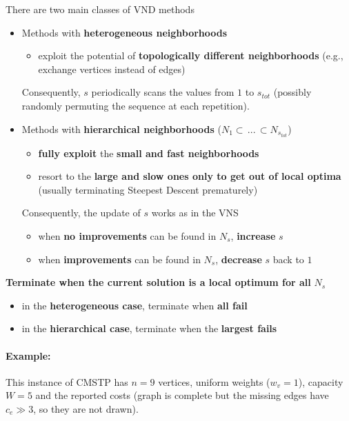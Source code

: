 There are two main classes of VND methods
\begin{itemize}
	\item Methods with \textbf{heterogeneous neighborhoods}
	\begin{itemize}
		\item exploit the potential of \textbf{topologically different neighborhoods} (e.g., exchange vertices instead of edges)
	\end{itemize}
	Consequently, $s$ periodically scans the values from $1$ to $s_{tot}$ (possibly randomly permuting the sequence at each repetition).\\
	
	\item Methods with \textbf{hierarchical neighborhoods} ($N_1 \subset \, ... \, \subset N_{s_{tot}}$)
	\begin{itemize}
		\item \textbf{fully exploit} the \textbf{small and fast neighborhoods}
		\item resort to the \textbf{large and slow ones only to get out of local optima} (usually terminating Steepest Descent prematurely)
	\end{itemize}
	Consequently, the update of $s$ works as in the VNS
	\begin{itemize}
		\item when \textbf{no improvements} can be found in $N_s$, \textbf{increase} $s$
		\item when \textbf{improvements} can be found in $N_s$, \textbf{decrease} $s$ back to $1$
	\end{itemize}
\end{itemize}

\textbf{Terminate when the current solution is a local optimum for all} $N_s$
\begin{itemize}
	\item in the \textbf{heterogeneous case}, terminate when \textbf{all fail}
	\item in the \textbf{hierarchical case}, terminate when the \textbf{largest fails}
\end{itemize}

\newpage

\paragraph{Example:} This instance of CMSTP has $n = 9$ vertices, uniform weights ($w_v = 1$), capacity $W = 5$ and the reported costs (graph is complete but the missing edges have $c_e \gg 3$, so they are not drawn).

